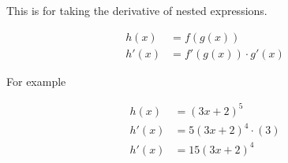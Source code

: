This is for taking the derivative of nested expressions.

\begin{align*}
  h(x) &= f(g(x)) \\
  h'(x) &= f'(g(x)) \cdot g'(x)
\end{align*}

For example

\begin{align*}
  h(x) &= \left(3x + 2\right)^5 \\
  h'(x) &= 5\left(3x + 2\right)^4 \cdot \left(3\right) \\
  h'(x) &= 15\left(3x + 2\right)^4
\end{align*}
